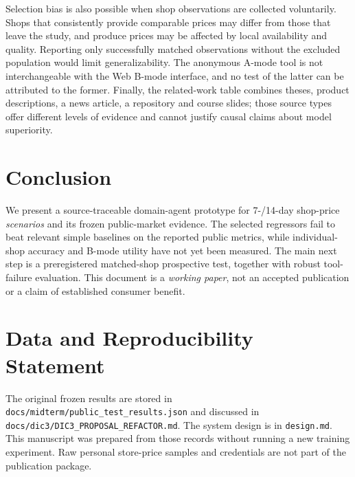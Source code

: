 \documentclass[conference]{IEEEtran}
\begin{document}
Selection bias is also possible when shop observations are collected voluntarily. Shops that consistently provide comparable prices may differ from those that leave the study, and produce prices may be affected by local availability and quality. Reporting only successfully matched observations without the excluded population would limit generalizability. The anonymous A-mode tool is not interchangeable with the Web B-mode interface, and no test of the latter can be attributed to the former. Finally, the related-work table combines theses, product descriptions, a news article, a repository and course slides; those source types offer different levels of evidence and cannot justify causal claims about model superiority.

\section{Conclusion}
We present a source-traceable domain-agent prototype for 7-/14-day shop-price \emph{scenarios} and its frozen public-market evidence. The selected regressors fail to beat relevant simple baselines on the reported public metrics, while individual-shop accuracy and B-mode utility have not yet been measured. The main next step is a preregistered matched-shop prospective test, together with robust tool-failure evaluation. This document is a \emph{working paper}, not an accepted publication or a claim of established consumer benefit.

\section*{Data and Reproducibility Statement}
The original frozen results are stored in \texttt{docs/midterm/public\_test\_results.json} and discussed in \texttt{docs/dic3/DIC3\_PROPOSAL\_REFACTOR.md}. The system design is in \texttt{design.md}. This manuscript was prepared from those records without running a new training experiment. Raw personal store-price samples and credentials are not part of the publication package.


\end{document}
